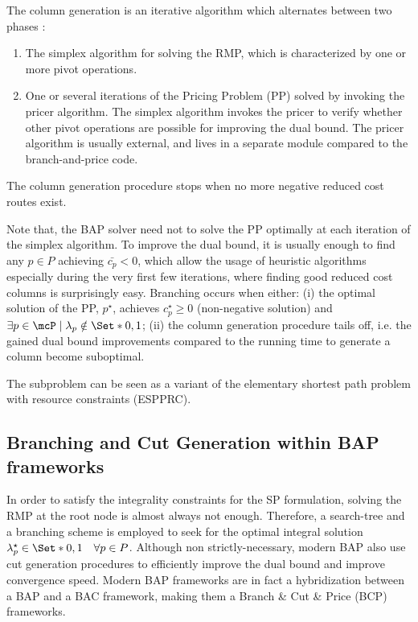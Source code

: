 The column generation is an iterative algorithm which alternates between two phases \parencite{desaulniers2018}:
\begin{enumerate}
    \item The simplex algorithm for solving the RMP, which is characterized by one or more pivot operations.
    \item One or several iterations of the Pricing Problem (PP) solved by invoking the pricer algorithm.
        The simplex algorithm invokes the pricer to verify whether other pivot operations are possible for improving the dual bound.
        The pricer algorithm is usually external, and lives in a separate module compared to the branch-and-price code.
\end{enumerate}

The column generation procedure stops when no more negative reduced cost routes exist.

Note that, the BAP solver need not to solve the PP optimally at each iteration of the simplex algorithm.
To improve the dual bound, it is usually enough to find any $p \in P$ achieving $\bar{c_p} < 0$, which allow the usage of heuristic algorithms especially during the very first few iterations, where finding good reduced cost columns is surprisingly easy.
Branching occurs when either: (i) the optimal solution of the PP, $p^\star$, achieves $c^\star_p \ge 0$ (non-negative solution) and $\exists p \in \mcP \mid \lambda_p \notin \Set*{0, 1}$; (ii) the column generation procedure tails off, i.e. the gained dual bound improvements compared to the running time to generate a column become suboptimal.

The subproblem can be seen as a variant of the elementary shortest path problem with resource constraints (ESPPRC).


\subsection{Branching and Cut Generation within BAP frameworks}
\label{sec:intro-branching-and-cut-generation-within-bap-frameworks}

In order to satisfy the integrality constraints for the SP formulation, solving the RMP at the root node
is almost always not enough.
Therefore, a search-tree and a branching scheme is employed to seek for the optimal integral solution $\lambda^\star_p \in \Set*{0, 1} \quad \forall p \in P$.
Although non strictly-necessary, modern BAP also use cut generation procedures to efficiently improve the dual bound and improve convergence speed.
Modern BAP frameworks are in fact a hybridization between a BAP and a BAC framework, making them a Branch \& Cut \& Price (BCP) frameworks.

